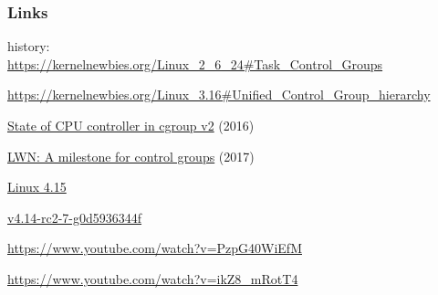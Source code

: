 \documentclass[serif]{beamer}
\begin{document}
\begin{frame}[fragile]
  \frametitle{Links}
  \tiny

  history:\\
  \url{https://kernelnewbies.org/Linux_2_6_24#Task_Control_Groups}

  \url{https://kernelnewbies.org/Linux_3.16#Unified_Control_Group_hierarchy}

  \href{https://lwn.net/Articles/697369/}{State of CPU controller in cgroup v2} (2016)

  \href{https://lwn.net/Articles/729215/}{LWN: A milestone for control groups} (2017)

  \href{https://kernelnewbies.org/Linux_4.15#Better_CPU_usage_restrictions_with_the_CPU_resource_controller_for_cgroupv2}{Linux 4.15}

  \href{https://git.kernel.org/pub/scm/linux/kernel/git/torvalds/linux.git/commit/?id=v4.14-rc2-7-g0d5936344f}{v4.14-rc2-7-g0d5936344f}

  \url{https://www.youtube.com/watch?v=PzpG40WiEfM}

  \url{https://www.youtube.com/watch?v=ikZ8_mRotT4}
\end{frame}
\end{document}
